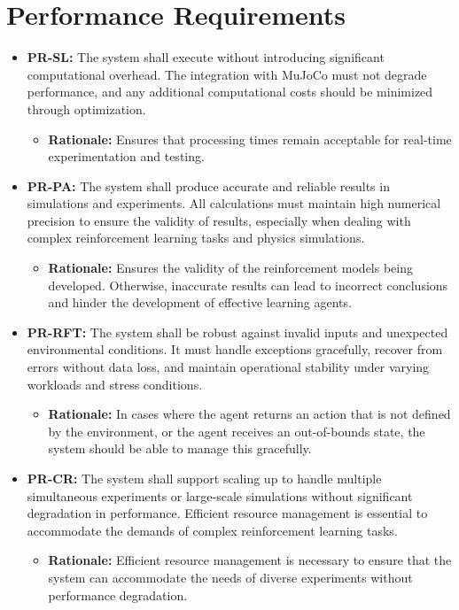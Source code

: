 \documentclass[12pt]{article}
\begin{document}
\section{Performance Requirements}
\begin{itemize}
\item \textbf{PR-SL:} The system shall execute without introducing significant computational overhead. The integration with MuJoCo must not degrade performance, and any additional computational costs should be minimized through optimization.
  \begin{itemize}
    \item \textbf{Rationale:} Ensures that processing times remain acceptable for real-time experimentation and testing.
  \end{itemize}

\item \textbf{PR-PA:} The system shall produce accurate and reliable results in simulations and experiments. All calculations must maintain high numerical precision to ensure the validity of results, especially when dealing with complex reinforcement learning tasks and physics simulations.
  \begin{itemize}
    \item \textbf{Rationale:} Ensures the validity of the reinforcement models being developed. Otherwise, inaccurate results can lead to incorrect conclusions and hinder the development of effective learning agents.
  \end{itemize}

\item \textbf{PR-RFT:} The system shall be robust against invalid inputs and unexpected environmental conditions. It must handle exceptions gracefully, recover from errors without data loss, and maintain operational stability under varying workloads and stress conditions.
  \begin{itemize}
    \item \textbf{Rationale:} In cases where the agent returns an action that is not defined by the environment, or the agent receives an out-of-bounds state, the system should be able to manage this gracefully.
  \end{itemize}

\item \textbf{PR-CR:} The system shall support scaling up to handle multiple simultaneous experiments or large-scale simulations without significant degradation in performance. Efficient resource management is essential to accommodate the demands of complex reinforcement learning tasks.
  \begin{itemize}
    \item \textbf{Rationale:} Efficient resource management is necessary to ensure that the system can accommodate the needs of diverse experiments without performance degradation.
  \end{itemize}


\end{itemize}
\end{document}
